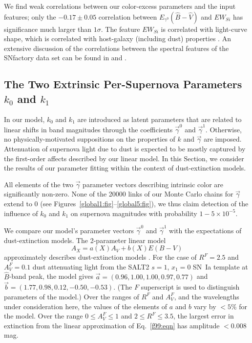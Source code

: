 \documentclass{aastex61}   	%
\begin{document}
We find weak correlations between our color-excess parameters and the input features; 
only the $ -0.17 \pm 0.05$ correlation
between $E_{\gamma^0}({\hat{B}}-{\hat{V}})$ and $EW_{Si}$ has significance much larger than $1 \sigma$.
The feature $EW_{Si}$ is correlated with light-curve shape, which is correlated with host-galaxy (including dust) properties 
\citep{2000AJ....120.1479H, 2003MNRAS.340.1057S}.
An extensive discussion of the correlations between the spectral features of the SNfactory data set can be found in \citet{chotard:thesis}
and \citet{leget:thesis}.

\subsection{The Two Extrinsic Per-Supernova Parameters $k_0$ and $k_1$}
In our model, $k_0$ and $k_1$ are introduced as latent parameters that are related to linear shifts in band magnitudes through
the  coefficients $\vec{\gamma}^0$ and
$\vec{\gamma}^1$.  Otherwise, no physically-motivated suppositions on the properties of $k$ and $\vec{\gamma}$ are imposed.
Attenuation of supernova light due to dust is expected to be mostly captured by the first-order affects described by our linear model.
In this Section, we consider the results of our parameter fitting within the context of  dust-extinction models.

All elements of the two $\vec{\gamma}$ parameter vectors 
describing intrinsic color
are significantly non-zero. 
None of the 20000 links of 
our Monte Carlo chains for $\vec{\gamma}$ extend to 0 (see Figures~\ref{global1:fig}--\ref{global5:fig}), we thus claim detection of the
influence of $k_0$ and $k_1$  on supernova magnitudes
with probability $1-5\times 10^{-5}$.

We compare our model's parameter vectors $\vec{\gamma}^0$ and $\vec{\gamma}^1$ with the expectations of  
dust-extinction
models.
The 2-parameter linear model
\begin{equation}
A_X = a(X)  A_{V} + b(X) E(B-V)
\label{f99:eqn}
\end{equation}
approximately describes  
dust-extinction
models \citep[for example, the wavelength-dependent model of ][is linear,
though its linearity is lost when integrated over broad-band filters]{1989ApJ...345..245C}.
For the case of
$R^F=2.5$ and $A^F_V=0.1$ dust attenuating light from the SALT2
\citep{2007A&A...466...11G} $s=1$, $x_1=0$ SN~Ia template at ${\hat{B}}$-band peak, the 
\citet{1999PASP..111...63F}  model
gives
$\vec{a} = (0.96,   1.00,   1.00,   0.97,   0.77)$ and $\vec{b}=(  1.77,   0.98,   0.12,  -0.50,  -0.53)$.
(The $F$ superscript is used to distinguish parameters of the  model.)
Over the ranges of
 $R^F$ and $A^F_V$,
and the wavelengths under consideration here,  the values of the elements of $a$ and $b$ vary by $<5$\%
for the
 model.
Over the range
 $0\le A^F_V\le 1$ and $2 \le R^F \le 3.5$, the largest error in extinction from the linear approximation of
Eq.~\ref{f99:eqn} has amplitude $<0.008$ mag.
\end{document}
